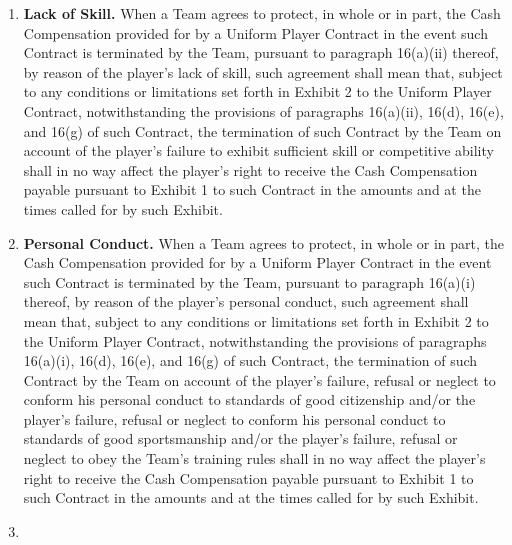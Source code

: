 \documentclass[
]{book}
\providecommand{\tightlist}{%
  \setlength{\itemsep}{0pt}\setlength{\parskip}{0pt}}
\begin{document}
\begin{enumerate}
\def\labelenumi{(\alph{enumi})}
\tightlist
\item
  \textbf{Lack of Skill.} When a Team agrees to protect, in whole or in part, the Cash Compensation provided for by a Uniform Player Contract in the event such Contract is terminated by the Team, pursuant to paragraph 16(a)(ii) thereof, by reason of the player's lack of skill, such agreement shall mean that, subject to any conditions or limitations set forth in Exhibit 2 to the Uniform Player Contract, notwithstanding the provisions of paragraphs 16(a)(ii), 16(d), 16(e), and 16(g) of such Contract, the termination of such Contract by the Team on account of the player's failure to exhibit sufficient skill or competitive ability shall in no way affect the player's right to receive the Cash Compensation payable pursuant to Exhibit 1 to such Contract in the amounts and at the times called for by such Exhibit.
\item
  \textbf{Personal Conduct.} When a Team agrees to protect, in whole or in part, the Cash Compensation provided for by a Uniform Player Contract in the event such Contract is terminated by the Team, pursuant to paragraph 16(a)(i) thereof, by reason of the player's personal conduct, such agreement shall mean that, subject to any conditions or limitations set forth in Exhibit 2 to the Uniform Player Contract, notwithstanding the provisions of paragraphs 16(a)(i), 16(d), 16(e), and 16(g) of such Contract, the termination of such Contract by the Team on account of the player's failure, refusal or neglect to conform his personal conduct to standards of good citizenship and/or the player's failure, refusal or neglect to conform his personal conduct to standards of good sportsmanship and/or the player's failure, refusal or neglect to obey the Team's training rules shall in no way affect the player's right to receive the Cash Compensation payable pursuant to Exhibit 1 to such Contract in the amounts and at the times called for by such Exhibit.
\item

\end{enumerate}
\end{document}

